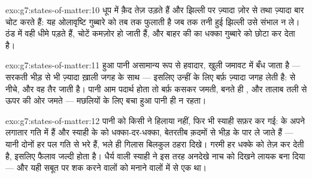 \begin{solution}{exo:g7:states-of-matter:10}
धूप में क़ैद  तेज़ उड़ते हैं और झिल्ली पर ज़्यादा ज़ोर से तथा
ज़्यादा बार चोट करते हैं: यह ओलावृष्टि गुब्बारे को तब तक फुलाती है जब
तक तनी हुई झिल्ली उसे संभाल न ले। ठंड में वही  धीमे पड़ते हैं, चोटें
कमज़ोर हो जाती हैं, और बाहर की  का धक्का गुब्बारे को छोटा कर देता
है।
\end{solution}

\begin{solution}{exo:g7:states-of-matter:11}
 हुआ पानी असामान्य रूप से हवादार, खुली जमावट में बँध जाता है ---
सरकती भीड़ से भी ज़्यादा ख़ाली जगह के साथ --- इसलिए उन्हीं  के
लिए बर्फ़ ज़्यादा जगह लेती है:   से नीचे, और वह तैर जाती है।
पानी आम पदार्थ होता तो बर्फ़ कसकर जमती, बनते ही , और तालाब तली से
ऊपर की ओर जमते --- मछलियों के लिए बचा हुआ पानी ही न रहता।
\end{solution}

\begin{solution}{exo:g7:states-of-matter:12}
पानी को किसी ने हिलाया नहीं, फिर भी स्याही सफ़र कर गई:  के अपने
 लगातार गति में हैं और स्याही के  को धक्का-दर-धक्का, बेतरतीब
क़दमों से भीड़ के पार ले जाते हैं --- यानी दोनों  हर पल गति से भरे
हैं, भले ही गिलास बिलकुल ठहरा दिखे। गरमी हर धक्के को तेज़ कर देती है,
इसलिए फैलाव जल्दी होता है। धैर्य वाली स्याही ने इस तरह अनदेखे नाच को
दिखने लायक बना दिया --- और यही सबूत  पर शक करने वालों को मनाने
वालों में से एक था।
\end{solution}

